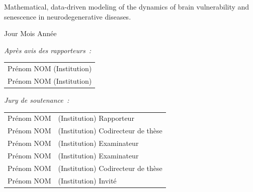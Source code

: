 \documentclass[12pt,a4paper]{article}
\begin{document}
\vspace{3mm}
 
\shorthandoff{:} 
\begin{center}
{\Large Mathematical, data-driven modeling of the dynamics of brain vulnerability and senescence in neurodegenerative diseases.}
\end{center}
\shorthandon{:} 


\vspace{10mm}

 Jour Mois Ann\'ee

\vspace{5mm}

\noindent
{\small \it Apr\`es avis des rapporteurs~: }
\begin{tabular}{l} {\sc Pr\'enom NOM} (Institution)\vspace{1mm}  \\
{\sc  Pr\'enom NOM} (Institution)\\
\end{tabular}

\vspace{8mm}

\noindent
{\small \it Jury de soutenance~: }
\begin{tabular}{ll}
{\sc   Pr\'enom NOM}&(Institution) {\small Rapporteur}\vspace{1mm}\\
{\sc   Pr\'enom NOM}&(Institution) {\small Codirecteur de th\`ese}\vspace{1mm}\\
{\sc   Pr\'enom NOM}&(Institution) {\small Examinateur}\vspace{1mm}\\
{\sc   Pr\'enom NOM}&(Institution) {\small Examinateur}\vspace{1mm}\\
{\sc   Pr\'enom NOM}&(Institution) {\small Codirecteur de th\`ese}\vspace{1mm}\\
{\sc   Pr\'enom NOM}&(Institution) {\small Invit\'e}\vspace{1mm}\\
\end{tabular}


\end{document}
